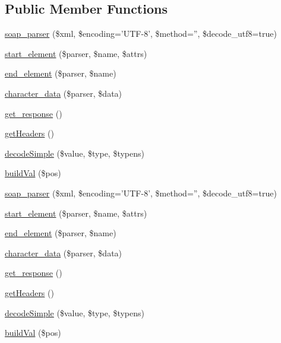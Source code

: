 \subsection*{Public Member Functions}
\begin{DoxyCompactItemize}
\item 
\hyperlink{classsoap__parser_a632e9d47e42c4f6660f9daed90058af5}{soap\-\_\-parser} (\$xml, \$encoding='U\-T\-F-\/8', \$method='', \$decode\-\_\-utf8=true)
\item 
\hyperlink{classsoap__parser_abf9dc4b028eeac08eeca4c7309a950e2}{start\-\_\-element} (\$parser, \$name, \$attrs)
\item 
\hyperlink{classsoap__parser_ad45367c512cbc2d4679d1a49db3802f2}{end\-\_\-element} (\$parser, \$name)
\item 
\hyperlink{classsoap__parser_a592a4f9b601cc33f15de0ad7a9c49ae5}{character\-\_\-data} (\$parser, \$data)
\item 
\hyperlink{classsoap__parser_acf3c69045efc130d3a325c26bd6ac5d0}{get\-\_\-response} ()
\item 
\hyperlink{classsoap__parser_a157e0005d82edaa21cbea07fdc5c62da}{get\-Headers} ()
\item 
\hyperlink{classsoap__parser_a9094260815e81487fef378ac6222e9a9}{decode\-Simple} (\$value, \$type, \$typens)
\item 
\hyperlink{classsoap__parser_a8a4609375662042387aa159de2edd196}{build\-Val} (\$pos)
\item 
\hyperlink{classsoap__parser_a632e9d47e42c4f6660f9daed90058af5}{soap\-\_\-parser} (\$xml, \$encoding='U\-T\-F-\/8', \$method='', \$decode\-\_\-utf8=true)
\item 
\hyperlink{classsoap__parser_abf9dc4b028eeac08eeca4c7309a950e2}{start\-\_\-element} (\$parser, \$name, \$attrs)
\item 
\hyperlink{classsoap__parser_ad45367c512cbc2d4679d1a49db3802f2}{end\-\_\-element} (\$parser, \$name)
\item 
\hyperlink{classsoap__parser_a592a4f9b601cc33f15de0ad7a9c49ae5}{character\-\_\-data} (\$parser, \$data)
\item 
\hyperlink{classsoap__parser_acf3c69045efc130d3a325c26bd6ac5d0}{get\-\_\-response} ()
\item 
\hyperlink{classsoap__parser_a157e0005d82edaa21cbea07fdc5c62da}{get\-Headers} ()
\item 
\hyperlink{classsoap__parser_a9094260815e81487fef378ac6222e9a9}{decode\-Simple} (\$value, \$type, \$typens)
\item 
\hyperlink{classsoap__parser_a8a4609375662042387aa159de2edd196}{build\-Val} (\$pos)
\end{DoxyCompactItemize}
